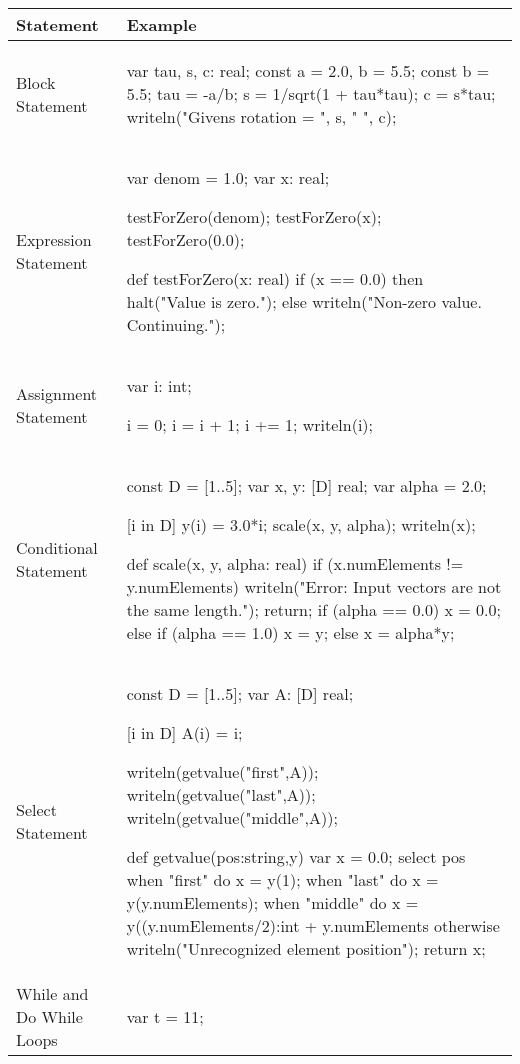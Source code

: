 \begin{center}
\begin{longtable}{|l|l|}
\hline
{\bf Statement} & {\bf Example} \\
\hline
\endhead
\hline
\endfoot
Block Statement &
\begin{chapel} %
var tau, s, c: real;
const a = 2.0, b = 5.5;
const b = 5.5;
{
tau = -a/b;
s = 1/sqrt(1 + tau*tau);
c = s*tau;
}
writeln("Givens rotation = ", s, " ", c);
\end{chapel} \\
\hline
Expression Statement & 
\begin{chapel} %
var denom = 1.0;
var x: real;

testForZero(denom);
testForZero(x);
testForZero(0.0);

def testForZero(x: real) {
  if (x == 0.0) then halt("Value is zero.");
  else writeln("Non-zero value.  Continuing.");   
}
\end{chapel} \\
\hline
Assignment Statement & 
\begin{chapel} %
var i: int;

i = 0;
i = i + 1;
i += 1;
writeln(i);
\end{chapel} \\
\hline
Conditional Statement &
\begin{chapel} %
const D = [1..5];
var x, y: [D] real;
var alpha = 2.0;

[i in D] y(i) = 3.0*i;
scale(x, y, alpha);
writeln(x);

def scale(x, y, alpha: real) {
  if (x.numElements != y.numElements) {
    writeln("Error:  Input vectors are not the same length.");
    return;
  }
  if (alpha == 0.0) {
    x = 0.0;
  } else if (alpha == 1.0) {
    x = y;
  } else {
    x = alpha*y;
  }
}
\end{chapel} \\
\hline
Select Statement &
\begin{chapel} %
const D = [1..5];
var A: [D] real;

[i in D] A(i) = i;

writeln(getvalue("first",A));
writeln(getvalue("last",A));
writeln(getvalue("middle",A));

def getvalue(pos:string,y) {
  var x = 0.0;
  select pos {
    when "first" do x = y(1);
    when "last" do x = y(y.numElements);
    when "middle" do x = y((y.numElements/2):int + y.numElements%
    otherwise writeln("Unrecognized element position");
  }
  return x;
}
\end{chapel} \\
\hline
While and Do While Loops &
\begin{chapel} %
var t = 11;


\end{chapel}
\end{longtable}
\end{center}
